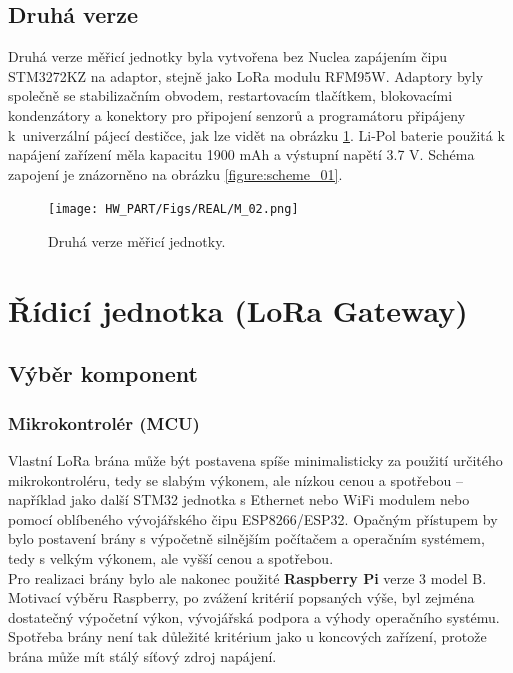 \subsection{Druhá verze}
    Druhá verze měřicí jednotky byla vytvořena bez Nuclea zapájením čipu STM3272KZ na adaptor, stejně jako LoRa modulu RFM95W. Adaptory byly společně se stabilizačním obvodem, restartovacím tlačítkem, blokovacími kondenzátory a konektory pro připojení senzorů a programátoru připájeny k~univerzální pájecí destičce, jak lze vidět na obrázku \ref{figure:second_prototype}. Li-Pol baterie použitá k napájení zařízení měla kapacitu 1900 mAh a výstupní napětí 3.7 V. Schéma zapojení je znázorněno na obrázku \ref{figure:scheme_01}.
    \begin{figure} [!htp]
        \centering
        \texttt{[image: HW\_PART/Figs/REAL/M\_02.png]}
        \caption {Druhá verze měřicí jednotky.}
        \label{figure:second_prototype}
    \end{figure} 





\section{Řídicí jednotka (LoRa Gateway)}
\subsection{Výběr komponent}
\subsubsection{Mikrokontrolér (MCU)}

    Vlastní LoRa brána může být postavena spíše minimalisticky za použití určitého mikrokontroléru, tedy se slabým výkonem, ale nízkou cenou a spotřebou – například jako další STM32 jednotka s Ethernet nebo WiFi modulem nebo pomocí oblíbeného vývojářského čipu ESP8266/ESP32. Opačným přístupem by bylo postavení brány s výpočetně silnějším počítačem a operačním systémem, tedy s velkým výkonem, ale vyšší cenou a spotřebou.\\
    Pro realizaci brány bylo ale nakonec použité \textbf{Raspberry Pi} verze 3 model B. 
    Motivací výběru Raspberry, po zvážení kritérií popsaných výše, byl zejména dostatečný výpočetní výkon, vývojářská podpora a výhody operačního systému. Spotřeba brány není tak důležité kritérium jako u koncových zařízení, protože brána může mít stálý síťový zdroj napájení.
    
